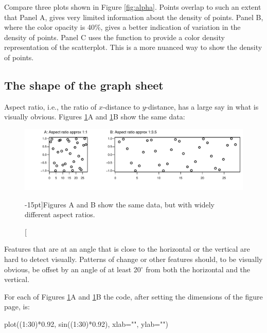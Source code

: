   Compare
three plots shown in Figure \ref{fig:alpha}.  Points overlap to such
an extent that Panel A, gives very limited information about the
density of points.  Panel B, where the color opacity is 40\%, gives a
better indication of variation in the density of points.  Panel C uses
the function  to provide a color density
representation of the scatterplot.  This is a more nuanced
way to show the density of points.

\subsection{The shape of the graph sheet}
Aspect ratio, i.e., the ratio of $x$-distance to $y$-distance, has a
large say in what is visually obvious.  Figures \ref{fig:aspect}A and
\ref{fig:aspect}B show the same data:
\begin{figure}
\begin{Schunk}


\centerline{\includegraphics[width=\textwidth]{figs/09-fig8_3e-1} }

\end{Schunk}
\caption[][-15pt]{Figures A and B show the same data, but with widely different
  aspect ratios.\label{fig:aspect}}
\end{figure}
\noindent
Features that are at an angle that is close to the horizontal or the
vertical are hard to detect visually. Patterns of change or other
features should, to be visually obvious, be offset by an angle of
at least 20$^\circ$ from both the horizontal and the vertical.

\noindent For each of Figures \ref{fig:aspect}A and \ref{fig:aspect}B
the code, after setting the dimensions of the figure page, is:
\begin{Schunk}
\begin{Sinput}
plot((1:30)*0.92, sin((1:30)*0.92),
     xlab="", ylab="")
\end{Sinput}
\end{Schunk}

